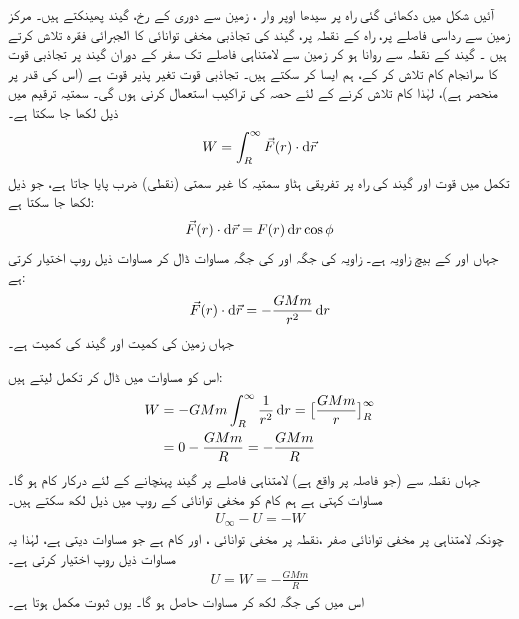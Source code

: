 آئیں شکل  میں دکھائی گئی راہ پر سیدھا  اوپر وار ، زمین سے دوری کے رخ، گیند پھینکتے ہیں۔  مرکز زمین سے  رداسی فاصلے پر، راہ  کے نقطہ  پر، گیند کی تجاذبی مخفی توانائی  کا الجبرائی فقرہ تلاش کرتے ہیں   ۔ گیند  کے نقطہ  سے روانا ہو کر زمین سے لامتناہی فاصلے تک  سفر کے دوران گیند پر تجاذبی قوت کا سرانجام کام  تلاش کر کے، ہم ایسا کر سکتے ہیں۔ تجاذبی قوت  تغیر پذیر قوت ہے (اس کی قدر  پر منحصر ہے)، لہٰذا  کام تلاش کرنے کے لئے  حصہ  کی تراکیب استعمال کرنی ہوں گی۔  سمتیہ ترقیم میں ذیل لکھا جا سکتا ہے۔
\begin{align}\label{مساوات_تجاذب_ثبوت_الف}
W=\int_{R}^{\infty} \vec{F}(r)\cdot \dif \vec{r}
\end{align}
تکمل میں قوت  اور گیند کی راہ  پر تفریقی ہٹاو سمتیہ  کا غیر سمتی (نقطی) ضرب پایا جاتا ہے، جو ذیل لکھا جا سکتا ہے:
\begin{align}\label{مساوات_تجاذب_ثبوت_ب}
\vec{F}(r)\cdot \dif \vec{r}=F(r)\dif r\cos\phi
\end{align}
جہاں  اور  کے بیچ زاویہ  ہے۔ زاویہ  کی جگہ  اور  کی جگہ مساوات  ڈال کر مساوات  ذیل روپ اختیار کرتی ہے:
\begin{align*}
\vec{F}(r)\cdot \dif \vec{r}=-\frac{GMm}{r^2}\dif r
\end{align*}
جہاں زمین کی کمیت  اور گیند کی کمیت  ہے۔

اس کو مساوات  میں ڈال کر تکمل لیتے ہیں:
\begin{gather}
\begin{aligned}\label{مساوات_تجاذب_ثبوت_پ}
W&=-GMm\int_{R}^{\infty} \frac{1}{r^2}\dif r=\big[\frac{GMm}{r}\big]_{R}^{\infty}\\
&=0-\frac{GMm}{R}=-\frac{GMm}{R}
\end{aligned}
\end{gather}
جہاں نقطہ  سے (جو فاصلہ  پر واقع ہے)  لامتناہی  فاصلے پر گیند  پہنچانے کے لئے درکار کام  ہو گا۔ مساوات   کہتی ہے ہم کام کو مخفی توانائی  کے روپ میں ذیل  لکھ سکتے ہیں۔
\begin{align*}
U_{\infty}-U=-W
\end{align*}
چونکہ لامتناہی پر مخفی توانائی  صفر ،نقطہ    پر مخفی توانائی   ، اور  کام ہے جو مساوات   دیتی  ہے، لہٰذا  یہ مساوات ذیل روپ اختیار کرتی ہے۔
\begin{align*}
U=W=-\frac{GMm}{R}
\end{align*}
اس میں  کی جگہ  لکھ کر مساوات   حاصل ہو گا۔ یوں ثبوت مکمل ہوتا ہے۔

